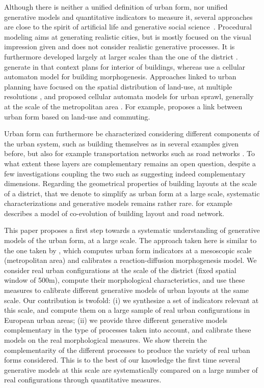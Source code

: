 \documentclass[letterpaper]{article}
\begin{document}
Although there is neither a unified definition of urban form, nor unified generative models and quantitative indicators to measure it, several approaches are close to the spirit of artificial life and generative social science~\citep{bonabeau1997classical,epstein1999agent}.
Procedural modeling \citep{watson2008procedural} aims at generating realistic cities, but is mostly focused on the visual impression given and does not consider realistic generative processes.
It is furthermore developed largely at larger scales than the one of the district \citep{Parish:2001:PMC:383259.383292}. \cite{merrell2010computer} generate in that context plans for interior of buildings, whereas \cite{cruz2017generation} use a cellular automaton model for building morphogenesis.
Approaches linked to urban planning have focused on the spatial distribution of land-use, at multiple resolutions \citep{liu2017future}, and proposed cellular automata models for urban sprawl, generally at the scale of the metropolitan area \citep{herold2003spatiotemporal}. For example, \cite{horner2007multi} proposes a link between urban form based on land-use and commuting.


Urban form can furthermore be characterized considering different components of the urban system, such as building themselves as in several examples given before, but also for example transportation networks such as road networks \citep{ye2014quantitative}. To what extent these layers are complementary remains an open question, despite a few investigations coupling the two such as \cite{raimbault2018urban} suggesting indeed complementary dimensions. Regarding the geometrical properties of building layouts at the scale of a district, that we denote to simplify as urban form at a large scale, systematic characterizations and generative models remains rather rare. \cite{achibet2014model} for example describes a model of co-evolution of building layout and road network.



This paper proposes a first step towards a systematic understanding of generative models of the urban form, at a large scale.
The approach taken here is similar to the one taken by \cite{raimbault2018calibration}, which computes urban form indicators at a mesoscopic scale (metropolitan area) and calibrates a reaction-diffusion morphogenesis model.
We consider real urban configurations at the scale of the district (fixed spatial window of 500m), compute their morphological characteristics, and use these measures to calibrate different generative models of urban layouts at the same scale.
Our contribution is twofold: (i) we synthesize a set of indicators relevant at this scale, and compute them on a large sample of real urban configurations in European urban areas; (ii) we provide three different generative models complementary in the type of processes taken into account, and calibrate these models on the real morphological measures. We show therein the complementarity of the different processes to produce the variety of real urban forms considered.
This is to the best of our knowledge the first time several generative models at this scale are systematically compared on a large number of real configurations through quantitative measures.
\end{document}
